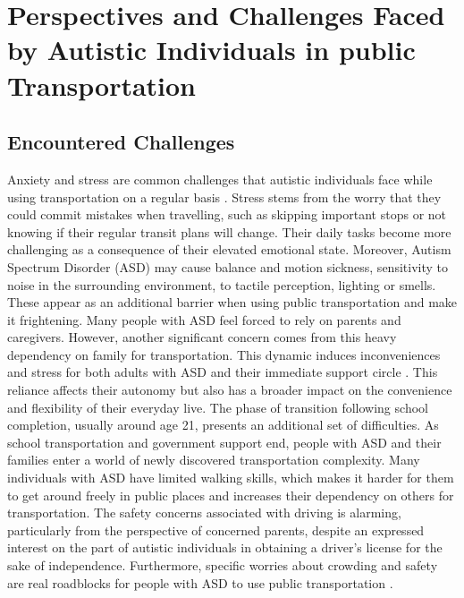 \section{Perspectives and Challenges Faced by Autistic Individuals in public Transportation}
    
\subsection{Encountered Challenges}

    Anxiety and stress are common challenges that autistic individuals face while using transportation on a regular basis \cite{2020ExperiencesYoungAutistic}. Stress stems from the worry that they could commit mistakes when travelling, such as skipping important stops or not knowing if their regular transit plans will change. Their daily tasks become more challenging as a consequence of their elevated emotional state. 
    Moreover, Autism Spectrum Disorder (ASD) may cause balance and motion sickness, sensitivity to noise in the surrounding environment, to tactile perception, lighting or smells. These appear as an additional barrier when using public transportation and make it frightening.
\newline
\newline
    Many people with ASD feel forced to rely on parents and caregivers. However, another significant concern comes from this heavy dependency on family for transportation. This dynamic induces inconveniences and stress for both adults with ASD and their immediate support circle \cite{2015DetourRightPlace}. This reliance affects their autonomy but also has a broader impact on the convenience and flexibility of their everyday live. 
    The phase of transition following school completion, usually around age 21, presents an additional set of difficulties. As school transportation and government support end,  people with ASD and their families enter a world of newly discovered transportation complexity.
    Many individuals with ASD have limited walking skills, which makes it harder for them to get around freely in public places and increases their dependency on others for transportation.
    The safety concerns associated with driving is alarming, particularly from the perspective of concerned parents, despite an expressed interest on the part of autistic individuals in obtaining a driver's license for the sake of independence. 
\newline
\newline
    Furthermore, specific worries about crowding and safety are real roadblocks for people with ASD to use public transportation \cite{2015ViewpointsAdultsAutism}.
    


